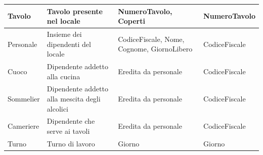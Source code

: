\begin{longtable}{p{2.5cm} p{4cm} p{5cm} p{2.5cm}}
    Tavolo & Tavolo presente nel locale & NumeroTavolo, Coperti & NumeroTavolo\\ \midrule
    Personale & Insieme dei dipendenti del locale & CodiceFiscale, Nome, Cognome, GiornoLibero & CodiceFiscale\\ \midrule
    Cuoco & Dipendente addetto alla cucina & Eredita da personale & CodiceFiscale\\ \midrule
    Sommelier & Dipendente addetto alla mescita degli alcolici & Eredita da personale & CodiceFiscale\\ \midrule
    Cameriere & Dipendente che serve ai tavoli & Eredita da personale & CodiceFiscale\\ \midrule
    Turno & Turno di lavoro & Giorno & Giorno\\ 
    \bottomrule	
\end{longtable}

